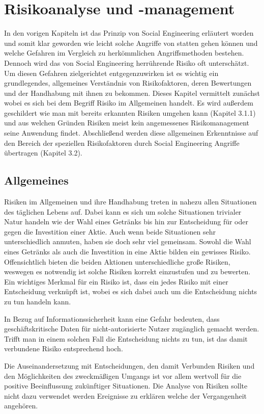 \section{Risikoanalyse und -management}\label{sec:risikoanalyse}
In den vorigen Kapiteln ist das Prinzip von Social Engineering erläutert worden und somit klar geworden wie leicht solche Angriffe von statten gehen können und welche Gefahren im Vergleich zu herkömmlichen Angriffsmethoden bestehen. Dennoch wird das von Social Engineering herrührende Risiko oft unterschätzt. Um diesen Gefahren zielgerichtet entgegenzuwirken ist es wichtig ein grundlegendes, allgemeines Verständnis von Risikofaktoren, deren Bewertungen und der Handhabung mit ihnen zu bekommen. Dieses Kapitel vermittelt zunächst wobei es sich bei dem Begriff Risiko im Allgemeinen handelt. Es wird außerdem geschildert wie man mit bereits erkannten Risiken umgehen kann (Kapitel 3.1.1) und aus welchen Gründen Risiken meist kein angemessenes Risikomanagement seine Anwendung findet. Abschließend werden diese allgemeinen Erkenntnisse auf den Bereich der speziellen Risikofaktoren durch Social Engineering Angriffe übertragen (Kapitel 3.2).

\subsection{Allgemeines}\label{sec:allgemeines}
Risiken im Allgemeinen und ihre Handhabung treten in nahezu allen Situationen des täglichen Lebens auf. Dabei kann es sich um solche Situationen trivialer Natur handeln wie der Wahl eines Getränks bis hin zur Entscheidung für oder gegen die Investition einer Aktie. Auch wenn beide Situationen sehr unterschiedlich anmuten, haben sie doch sehr viel gemeinsam. Sowohl die Wahl eines Getränks als auch die Investition in eine Aktie bilden ein gewisses Risiko. Offensichtlich bieten die beiden Aktionen unterschiedliche große Risiken, weswegen es notwendig ist solche Risiken korrekt einzustufen und zu bewerten. Ein wichtiges Merkmal für ein Risiko ist, dass ein jedes Risiko mit einer Entscheidung verknüpft ist, wobei es sich dabei auch um die Entscheidung nichts zu tun handeln kann.

In Bezug auf Informationssicherheit kann eine Gefahr bedeuten, dass geschäftskritische Daten für nicht-autorisierte Nutzer zugänglich gemacht werden. Trifft man in einem solchen Fall die Entscheidung nichts zu tun, ist das damit verbundene Risiko entsprechend hoch.

Die Auseinandersetzung mit Entscheidungen, den damit Verbunden Risiken und den Möglichkeiten des zweckmäßigen Umgangs ist vor allem wertvoll für die positive Beeinflussung zukünftiger Situationen. Die Analyse von Risiken sollte nicht dazu verwendet werden Ereignisse zu erklären welche der Vergangenheit angehören.

